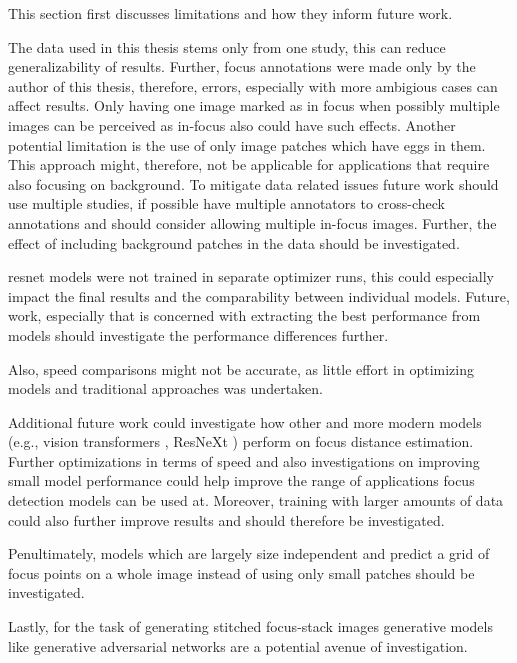This section first discusses limitations and how they inform future work.

The data used in this thesis stems only from one study, this can reduce generalizability of results. Further, focus annotations were made only by the author of this thesis, therefore, errors, especially with more ambigious cases can affect results. Only having one image marked as in focus when possibly multiple images can be perceived as in-focus also could have such effects.
Another potential limitation is the use of only image patches which have eggs in them. This approach might, therefore, not be applicable  for applications that require also focusing on background.
To mitigate data related issues future work should use multiple studies, if possible have multiple annotators to cross-check annotations and should consider allowing multiple in-focus images. Further, the effect of including background patches in the data should be investigated.

\Ac{resnet} models were not trained in separate optimizer runs, this could especially impact the final results and the comparability between individual models. Future, work, especially that is concerned with extracting the best performance from models should investigate the performance differences further.

Also, speed comparisons might not be accurate, as little effort in optimizing models and traditional approaches was undertaken.

Additional future work could investigate how other and more modern models (e.g., vision transformers \cite{dosovitskiy2021image}, ResNeXt \cite{xie2017aggregated}) perform on focus distance estimation. Further optimizations in terms of speed and also investigations on improving small model performance could help improve the range of applications focus detection models can be used at.
Moreover, training with larger amounts of data could also further improve results and should therefore be investigated.

Penultimately, models which are largely size independent and predict a grid of focus points on a whole image instead of using only small patches should be investigated.

Lastly, for the task of generating stitched focus-stack images generative models like generative adversarial networks \cite{goodfellow2014generative} are a potential avenue of investigation.